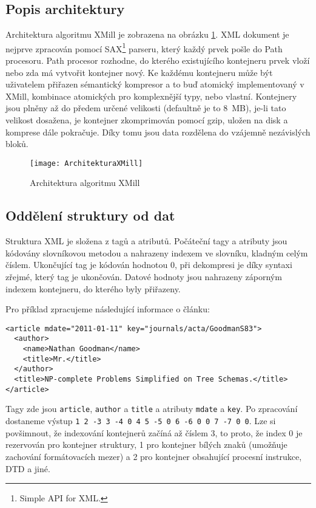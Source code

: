 \subsection{Popis architektury}
Architektura algoritmu XMill je zobrazena na obrázku \ref{architekturaXMill}. XML dokument je nejprve zpracován pomocí SAX\footnote{Simple API for XML.} parseru, který každý prvek pošle do Path procesoru. Path procesor rozhodne, do kterého existujícího kontejneru prvek vloží nebo zda má vytvořit kontejner nový. Ke každému kontejneru může být uživatelem přiřazen sémantický kompresor a to buď atomický implementovaný v XMill, kombinace atomických pro komplexnější typy, nebo vlastní. Kontejnery jsou plněny až do předem určené velikosti (defaultně je to 8~MB), je-li tato velikost dosažena, je kontejner zkomprimován pomocí gzip, uložen na disk a komprese dále pokračuje. Díky tomu jsou data rozdělena do vzájemně nezávislých bloků.

\begin{figure}[!htb]
\centering
\texttt{[image: ArchitekturaXMill]}
\caption{Architektura algoritmu XMill \cite{xmill}}
\label{architekturaXMill}
\end{figure}

\subsection{Oddělení struktury od dat}
\label{xmillOddeleniStruktury}
Struktura XML je složena z tagů a atributů. Počáteční tagy a atributy jsou kódovány slovníkovou metodou a nahrazeny indexem ve slovníku, kladným celým číslem. Ukončující tag je kódován hodnotou 0, při dekompresi je díky syntaxi zřejmé, který tag je ukončován. Datové hodnoty jsou nahrazeny záporným indexem kontejneru, do kterého byly přiřazeny. \cite{xmill}

Pro příklad zpracujeme následující informace o článku:

\begin{verbatim}
<article mdate="2011-01-11" key="journals/acta/GoodmanS83">
  <author>
    <name>Nathan Goodman</name>
    <title>Mr.</title>
  </author>
  <title>NP-complete Problems Simplified on Tree Schemas.</title>
</article>
\end{verbatim}

Tagy zde jsou \texttt{article}, \texttt{author} a \texttt{title} a atributy \texttt{mdate} a \texttt{key}. Po zpracování dostaneme výstup \texttt{1 2 -3 3 -4 0 4 5 -5 0 6 -6 0 0 7 -7 0 0}. Lze si povšimnout, že indexování kontejnerů začíná až číslem 3, to proto, že index 0 je rezervován pro kontejner struktury, 1 pro kontejner bílých znaků (umožňuje zachování formátovacích mezer) a 2 pro kontejner obsahující procesní instrukce, DTD a jiné.

